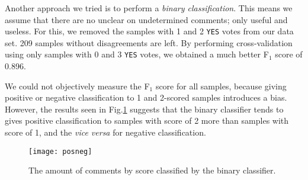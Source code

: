 
Another approach we tried is to perform a \emph{binary classification}.
This means we assume that there are no unclear on undetermined comments; only useful and useless.
For this, we removed the samples with 1 and 2 \texttt{YES} votes from our data set. 209 samples without disagreements are left.
By performing cross-validation using only samples with 0 and 3 \texttt{YES} votes, we obtained a much better F$_1$ score of 0.896.

We could not objectively measure the F$_1$ score for all samples, because giving positive or negative classification to 1 and 2-scored samples introduces a bias.
However, the results seen in Fig.\ref{fig:binary} suggests that the binary classifier tends to gives positive classification to samples with score of 2 more than samples with score of 1, and the \emph{vice versa} for negative classification.

\begin{figure}[h]
\centering
\texttt{[image: posneg]}
\caption{The amount of comments by score classified by the binary classifier.}
\label{fig:binary}
\end{figure}
